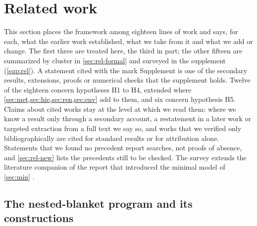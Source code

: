 \section{Related work}\label{sec:rel}

This section places the framework among eighteen lines of work and says, for each, what the earlier work established, what we take from it and what we add or change. The first three are treated here, the third in part; the other fifteen are summarized by cluster in \cref{sec:rel-formal} and surveyed in the supplement (\cref{sup:rel}). A statement cited with the mark Supplement is one of the secondary results, extensions, proofs or numerical checks that the supplement holds. Twelve of the eighteen concern hypotheses H1 to H4, extended where \cref{sec:met,sec:hie,sec:ren,sec:env} add to them, and six concern hypothesis H5. Claims about cited works stay at the level at which we read them: where we know a result only through a secondary account, a restatement in a later work or targeted extraction from a full text we say so, and works that we verified only bibliographically are cited for standard results or for attribution alone. Statements that we found no precedent report searches, not proofs of absence, and \cref{sec:rel-new} lists the precedents still to be checked. The survey extends the literature companion \citep{dennis2026literature} of the report that introduced the minimal model of \cref{sec:min} \citep{dennis2026communicating}.

\subsection{The nested-blanket program and its constructions}\label{sec:rel-nested}

